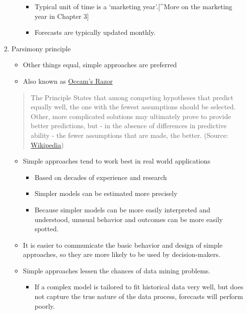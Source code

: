 \documentclass[
  letterpaper,
  DIV=11,
  numbers=noendperiod]{scrreprt}
\providecommand{\tightlist}{%
  \setlength{\itemsep}{0pt}\setlength{\parskip}{0pt}}\usepackage{longtable,booktabs,array}
\begin{document}
\begin{enumerate}
\begin{itemize}
    \begin{itemize}
    \tightlist
    \item
      Typical unit of time is a `marketing year'.{[}\^{}More on the
      marketing year in Chapter 3{]}
    \item
      Forecasts are typically updated monthly.
    \end{itemize}
  \end{itemize}
\item
  Parsimony principle

  \begin{itemize}
  \tightlist
  \item
    Other things equal, simple approaches are preferred
  \item
    Also known as
    \href{https://en.wikipedia.org/wiki/Occam\%27s_razor}{Occam's Razor}
  \end{itemize}

  \begin{quote}
  The Principle States that among competing hypotheses that predict
  equally well, the one with the fewest assumptions should be selected.
  Other, more complicated solutions may ultimately prove to provide
  better predictions, but - in the absence of differences in predictive
  ability - the fewer assumptions that are made, the better. (Source:
  \href{https://en.wikipedia.org/wiki/Occam\%27s_razor}{Wikipedia})
  \end{quote}

  \begin{itemize}
  \item
    Simple approaches tend to work best in real world applications

    \begin{itemize}
    \tightlist
    \item
      Based on decades of experience and research
    \item
      Simpler models can be estimated more precisely
    \item
      Because simpler models can be more easily interpreted and
      understood, unusual behavior and outcomes can be more easily
      spotted.
    \end{itemize}
  \item
    It is easier to communicate the basic behavior and design of simple
    approaches, so they are more likely to be used by decision-makers.
  \item
    Simple approaches lessen the chances of data mining problems.

    \begin{itemize}
    \tightlist
    \item
      If a complex model is tailored to fit historical data very well,
      but does not capture the true nature of the data process,
      forecasts will perform poorly.
    \end{itemize}
  \end{itemize}
\end{enumerate}
\end{document}
